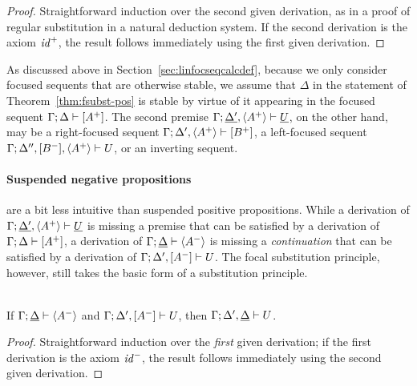 \begin{proof}
  Straightforward induction over the second given derivation, as in a
  proof of regular substitution in a natural deduction system. If the
  second derivation is the axiom ${\it id}^+$, the result follows
  immediately using the first given derivation.
\end{proof}

\noindent
As discussed above in Section~\ref{sec:linfocseqcalcdef}, because we
only consider focused sequents that are otherwise stable, we assume
that $\Delta$ in the statement of Theorem~\ref{thm:fsubst-pos} is
stable by virtue of it appearing in the focused sequent
${\Gamma};{\Delta} \vdash {[A^+]} \mathstrut$. The second premise
${\Gamma};{\underline{\Delta'}, \langle A^+
  \rangle} \vdash {\underline{U}} \mathstrut$, on the other hand, may be a right-focused
sequent ${\Gamma};{\Delta', \langle A^+ \rangle} \vdash {[B^+]} \mathstrut$, a
left-focused sequent ${\Gamma};{\Delta'', [B^-], \langle A^+
  \rangle} \vdash {U} \mathstrut$, or an inverting sequent.

\paragraph{Suspended negative propositions} are a bit less intuitive
than suspended positive propositions. While a derivation of
${\Gamma};{\underline{\Delta'}, \langle A^+
  \rangle} \vdash {\underline{U}} \mathstrut$ is missing a premise that can be satisfied
by a derivation of ${\Gamma};{\Delta} \vdash {[A^+]} \mathstrut$, a derivation of
${\Gamma};{\underline{\Delta}} \vdash {\langle A^- \rangle} \mathstrut$ is missing
a {\it continuation} that can be satisfied by a derivation of
${\Gamma};{\Delta', [A^-]} \vdash {U} \mathstrut$. The focal substitution
principle, however, still takes the basic form of a substitution
principle.

\bigskip
\begin{theorem}\label{thm:fsubst-neg}~\\
If ${\Gamma};{\underline{\Delta}} \vdash {\langle A^- \rangle} \mathstrut$
and ${\Gamma};{\Delta', [A^-]} \vdash {U} \mathstrut$, 
then ${\Gamma};{\Delta', \underline{\Delta}} \vdash {U} \mathstrut$. 
\end{theorem}

\begin{proof}
  Straightforward induction over the {\it first} given derivation; if
  the first derivation is the axiom ${\it id}^-$, the result follows
  immediately using the second given derivation.
\end{proof}

